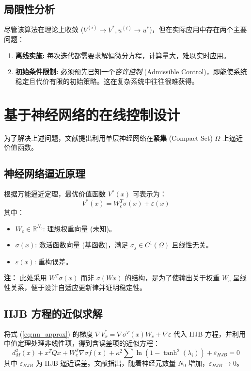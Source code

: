 \documentclass[a4paper,12pt]{article}
\newcommand{\R}{\mathbb{R}}
\newcommand{\trans}{^T}
\begin{document}
\subsection{局限性分析}
尽管该算法在理论上收敛 ($V^{(i)} \to V^*, u^{(i)} \to u^*$)，但在实际应用中存在两个主要问题：
\begin{enumerate}
    \item \textbf{离线实施:} 每次迭代都需要求解偏微分方程，计算量大，难以实时应用。
    \item \textbf{初始条件限制:} 必须预先已知一个\textit{容许控制} (Admissible Control)，即能使系统稳定且代价有限的初始策略。这在复杂系统中往往很难获得。
\end{enumerate}

\section{基于神经网络的在线控制设计}

为了解决上述问题，文献提出利用单层神经网络在\textbf{紧集} (Compact Set) $\Omega$ 上逼近价值函数。

\subsection{神经网络逼近原理}
根据万能逼近定理，最优价值函数 $V^*(x)$ 可表示为：
\begin{equation}
    V^*(x) = W_c\trans \sigma(x) + \varepsilon(x)
    \label{eq:nn_approx}
\end{equation}
其中：
\begin{itemize}
    \item $W_c \in \R^{N_0}$: 理想权重向量 (未知)。
    \item $\sigma(x)$: 激活函数向量 (基函数)，满足 $\sigma_j \in C^1(\Omega)$ 且线性无关。
    \item $\varepsilon(x)$: 重构误差。
\end{itemize}

\textbf{注：} 此处采用 $W^T \sigma(x)$ 而非 $\sigma(Wx)$ 的结构，是为了使输出关于权重 $W_c$ 呈线性关系，便于设计自适应更新律并证明稳定性。

\subsection{HJB 方程的近似求解}
将式 (\ref{eq:nn_approx}) 的梯度 $\nabla V^*_x = \nabla \sigma\trans(x) W_c + \nabla \varepsilon$ 代入 HJB 方程，并利用中值定理处理非线性项，得到含误差项的近似方程：
\begin{equation}
    d_M^2(x) + x\trans Q x + W_c\trans \nabla \sigma f(x) + \kappa^2 \sum \ln(1-\tanh^2(\lambda_i)) + \varepsilon_{HJB} = 0
\end{equation}
其中 $\varepsilon_{HJB}$ 为 HJB 逼近误差。文献指出，随着神经元数量 $N_0$ 增加，$\varepsilon_{HJB} \to 0$。
\end{document}
